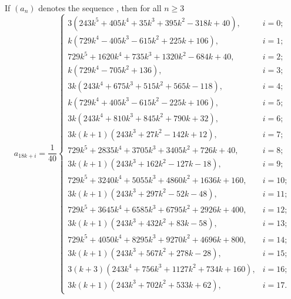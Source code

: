\begin{conjecture}\label{conj:kaprekar} If $(a_n)$ denotes the sequence , then
  for all $n\geq3$
\[
  a_{18k+i} = \frac{1}{40}\!
  \begin{cases}
    3 (243 k^5+405 k^4+35 k^3+395 k^2-318 k+40), & i=0; \\
    k (729 k^4-405 k^3-615 k^2+225 k+106), & i=1; \\
    729 k^5+1620 k^4+735 k^3+1320 k^2-684 k+40, & i=2; \\
    k (729 k^4-705 k^2+136), & i=3; \\
    3 k (243 k^4+675 k^3+515 k^2+565 k-118), & i=4; \\
    k (729 k^4+405 k^3-615 k^2-225 k+106), & i=5; \\
    3 k (243 k^4+810 k^3+845 k^2+790 k+32), & i=6; \\
    3 k (k+1) (243 k^3+27 k^2-142 k+12), & i=7; \\
    729 k^5+2835 k^4+3705 k^3+3405 k^2+726 k+40, & i=8; \\
    3 k (k+1) (243 k^3+162 k^2-127 k-18), & i=9; \\
    729 k^5+3240 k^4+5055 k^3+4860 k^2+1636 k+160, & i=10; \\
    3 k (k+1) (243 k^3+297 k^2-52 k-48), & i=11; \\
    729 k^5+3645 k^4+6585 k^3+6795 k^2+2926 k+400, & i=12; \\
    3 k (k+1) (243 k^3+432 k^2+83 k-58), & i=13; \\
    729 k^5+4050 k^4+8295 k^3+9270 k^2+4696 k+800, & i=14; \\
    3 k (k+1) (243 k^3+567 k^2+278 k-28), & i=15; \\
    3 (k+3) (243 k^4+756 k^3+1127 k^2+734 k+160), & i=16; \\
    3 k (k+1) (243 k^3+702 k^2+533 k+62), & i=17.
  \end{cases}
  \]
\end{conjecture}
